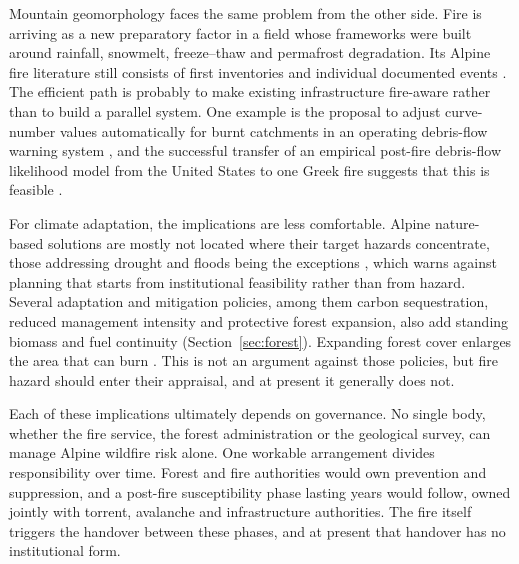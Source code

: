 \documentclass[11pt,a4paper]{article}
\begin{document}
Mountain geomorphology faces the same problem from the other side. Fire is arriving as a new preparatory factor in a field whose frameworks were built around rainfall, snowmelt, freeze--thaw and permafrost degradation. Its Alpine fire literature still consists of first inventories \citep{melzner_wildfire-induced_2025} and individual documented events \citep{tiranti_wildfires_2021, laporta_postwildfire_2025, melzner_brief_2019}. The efficient path is probably to make existing infrastructure fire-aware rather than to build a parallel system. One example is the proposal to adjust curve-number values automatically for burnt catchments in an operating debris-flow warning system \citep{tiranti_wildfires_2021}, and the successful transfer of an empirical post-fire debris-flow likelihood model from the United States to one Greek fire suggests that this is feasible \citep{diakakis_exploring_2023}.

For climate adaptation, the implications are less comfortable. Alpine nature-based solutions are mostly not located where their target hazards concentrate, those addressing drought and floods being the exceptions \citep{dubo_nature-based_2023}, which warns against planning that starts from institutional feasibility rather than from hazard. Several adaptation and mitigation policies, among them carbon sequestration, reduced management intensity and protective forest expansion, also add standing biomass and fuel continuity (Section~\ref{sec:forest}). Expanding forest cover enlarges the area that can burn \citep{gerberding_mapping_2025}. This is not an argument against those policies, but fire hazard should enter their appraisal, and at present it generally does not.

Each of these implications ultimately depends on governance. No single body, whether the fire service, the forest administration or the geological survey, can manage Alpine wildfire risk alone. One workable arrangement divides responsibility over time. Forest and fire authorities would own prevention and suppression, and a post-fire susceptibility phase lasting years would follow, owned jointly with torrent, avalanche and infrastructure authorities. The fire itself triggers the handover between these phases, and at present that handover has no institutional form.
\end{document}
